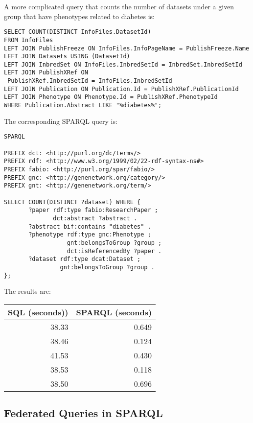 A more complicated query that counts the number of datasets under a given group that have phenotypes related to diabetes is:

\begin{Verbatim}[frame=single]
SELECT COUNT(DISTINCT InfoFiles.DatasetId)
FROM InfoFiles
LEFT JOIN PublishFreeze ON InfoFiles.InfoPageName = PublishFreeze.Name
LEFT JOIN Datasets USING (DatasetId)
LEFT JOIN InbredSet ON InfoFiles.InbredSetId = InbredSet.InbredSetId
LEFT JOIN PublishXRef ON
 PublishXRef.InbredSetId = InfoFiles.InbredSetId
LEFT JOIN Publication ON Publication.Id = PublishXRef.PublicationId
LEFT JOIN Phenotype ON Phenotype.Id = PublishXRef.PhenotypeId
WHERE Publication.Abstract LIKE "%diabetes%";
\end{Verbatim}

The corresponding SPARQL query is:

\begin{Verbatim}[frame=single]
SPARQL

PREFIX dct: <http://purl.org/dc/terms/>
PREFIX rdf: <http://www.w3.org/1999/02/22-rdf-syntax-ns#>
PREFIX fabio: <http://purl.org/spar/fabio/>
PREFIX gnc: <http://genenetwork.org/category/>
PREFIX gnt: <http://genenetwork.org/term/>

SELECT COUNT(DISTINCT ?dataset) WHERE {
       ?paper rdf:type fabio:ResearchPaper ;
              dct:abstract ?abstract .
       ?abstract bif:contains "diabetes" .
       ?phenotype rdf:type gnc:Phenotype ;
                  gnt:belongsToGroup ?group ;
                  dct:isReferencedBy ?paper .
       ?dataset rdf:type dcat:Dataset ;
                gnt:belongsToGroup ?group .
};
\end{Verbatim}

The results are:

\begin{center}
\begin{tabular}{rr}
SQL (seconds)) & SPARQL (seconds)\\[0pt]
\toprule
38.33 & 0.649\\[0pt]
38.46 & 0.124\\[0pt]
41.53 & 0.430\\[0pt]
38.53 & 0.118\\[0pt]
38.50 & 0.696\\[0pt]
\end{tabular}
\end{center}

\subsection{Federated Queries in SPARQL}

